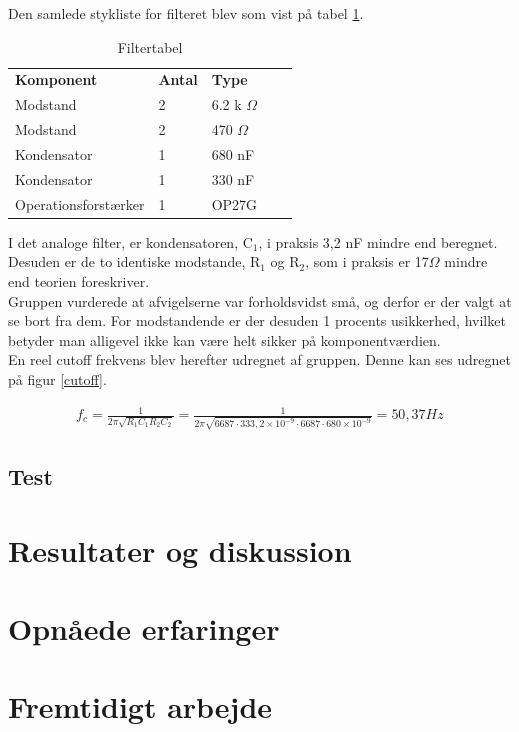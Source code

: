 Den samlede stykliste for filteret blev som vist på tabel \ref{Filtertabel}.

\begin{table}[H]
\centering
\begin{tabular}{lllll}
\textbf{Komponent} & \textbf{Antal} & \textbf{Type}  &  &  \\ \cline{1-3}
Modstand           & 2              & 6.2 k $\Omega$ &  &  \\ \cline{1-3}
Modstand           & 2              & 470 $\Omega$   &  &  \\ \cline{1-3}
Kondensator        & 1              & 680 nF         &  &  \\ \cline{1-3}
Kondensator        & 1              & 330 nF         &  &  \\ \cline{1-3}
Operationsforstærker &    1         & OP27G          &  &  \\ \cline{1-3}
\end{tabular}
\caption{Filtertabel}
\label{Filtertabel}
\end{table}

I det analoge filter, er kondensatoren, C$_1$, i praksis 3,2 nF mindre end  beregnet. Desuden er de to identiske modstande, R$_1$ og R$_2$, som i praksis er 17$\Omega$ mindre end teorien foreskriver.\\
Gruppen vurderede at afvigelserne var forholdsvidst små, og derfor er der valgt at se bort fra dem. For modstandende er der desuden 1 procents usikkerhed, hvilket betyder man alligevel ikke kan være helt sikker på komponentværdien.\\
En reel cutoff frekvens blev herefter udregnet af gruppen. Denne kan ses udregnet på figur \ref{cutoff}.


\begin{align}
f_{c} = \frac{1}{2\pi \sqrt{R_{1}C_{1}R_{2}C_{2}}} = \frac{1}{2\pi \sqrt{6687 \cdot 333,2\times 10^{-9} \cdot 6687 \cdot 680\times 10^{-9}}} = 50,37 Hz
	\label{cutoff}
\end{align}



\subsection{Test}


\section{Resultater og diskussion}


\section{Opnåede erfaringer}


\section{Fremtidigt arbejde}
